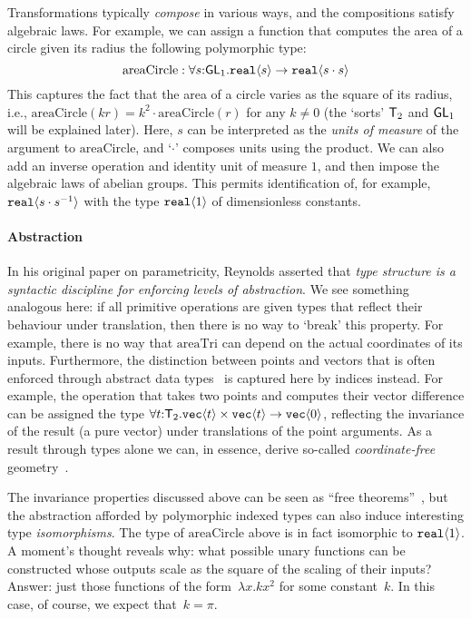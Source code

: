 Transformations typically \emph{compose} in various
ways, and the compositions satisfy algebraic laws. For example, 
we can assign a function that computes the area of a circle given its
radius the following polymorphic type:
\[
\mathrm{areaCircle} : \forall s\mathord:\mathsf{GL}_1.\textup{\texttt{real}}\langle s \rangle\to
\textup{\texttt{real}}\langle s\cdot s \rangle
\]
This captures the fact that the area of a circle varies as the square
of its radius, i.e., $\mathrm{areaCircle}(k r) = k^2\cdot
\mathrm{areaCircle}(r)$ for any $k\neq 0$ (the `sorts' $\mathsf{T}_2$ and
$\mathsf{GL}_1$ will be explained later).  Here, $s$ 
can be interpreted as the \emph{units of measure} of the argument to
$\mathrm{areaCircle}$, and `$\cdot$' composes units using the
product. We can also add an inverse operation and identity unit of
measure $1$, and then impose the algebraic laws of abelian
groups. This permits identification of, for example,
$\textup{\texttt{real}}\langle s\cdot s^{-1} \rangle$ with the type
$\textup{\texttt{real}}\langle 1 \rangle$ of dimensionless constants.

\paragraph{Abstraction}
In his original paper on parametricity, Reynolds asserted that
\emph{type structure is a syntactic discipline for enforcing levels of
  abstraction}.  We see something analogous here: if all primitive
operations are given types that reflect their behaviour under
translation, then there is no way to `break' this property. For
example, there is no way that $\mathrm{areaTri}$ can depend on the
actual coordinates of its inputs. Furthermore, the distinction between
points and vectors that is often enforced through abstract data
types~\cite{CGAL} is captured here by indices instead. For example,
the operation that takes two points and computes their vector
difference can be assigned the type
$\forall t\mathord:\mathsf{T}_2.\textup{\texttt{vec}}\langle t \rangle\times\textup{\texttt{vec}}\langle t \rangle\to\textup{\texttt{vec}}\langle 0 \rangle$,
reflecting the invariance of the result (a pure vector) under
translations of the point arguments. As a result through types alone
we can, in essence, derive so-called \emph{coordinate-free}
geometry~\cite{CFGADT}.

The invariance properties discussed above can be seen as ``free
theorems''~\cite{wadler89theorems}, but the abstraction afforded by
polymorphic indexed types can also induce interesting type
\emph{isomorphisms}.  The type of $\mathrm{areaCircle}$ above is in
fact isomorphic to $\textup{\texttt{real}}\langle 1 \rangle$. A moment's thought reveals why:
what possible unary functions can be constructed whose outputs scale
as the square of the scaling of their inputs?  Answer: just those
functions of the form~$\lambda x. k x^2$ for some constant~$k$.  In
this case, of course, we expect that~$k = \pi$.


